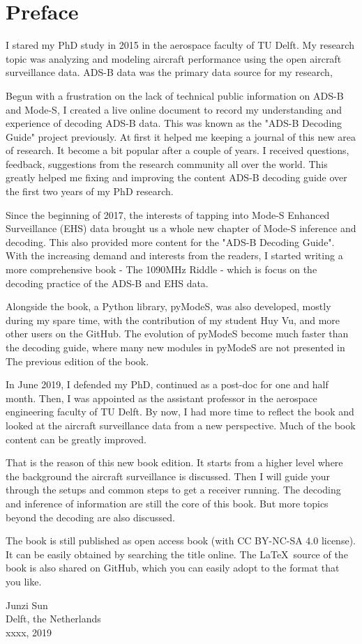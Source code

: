 \chapter*{Preface} \label{preface}
I stared my PhD study in 2015 in the aerospace faculty of TU Delft. My research topic was analyzing and modeling aircraft performance using the open aircraft surveillance data. ADS-B data was the primary data source for my research,

Begun with a frustration on the lack of technical public information on ADS-B and Mode-S, I created a live online document to record my understanding and experience of decoding ADS-B data. This was known as the "ADS-B Decoding Guide" project previously. At first it helped me keeping a journal of this new area of research. It become a bit popular after a couple of years. I received questions, feedback, suggestions from the research community all over the world. This greatly helped me fixing and improving the content ADS-B decoding guide over the first two years of my PhD research.

Since the beginning of 2017, the interests of tapping into
Mode-S Enhanced Surveillance (EHS) data brought us a whole new chapter of Mode-S inference and decoding. This also provided more content for the "ADS-B Decoding Guide". With the increasing demand and interests from the readers, I started writing a more comprehensive book - The 1090MHz Riddle - which is focus on the decoding practice of the ADS-B and EHS data.

Alongside the book, a Python library, pyModeS, was also developed, mostly during my spare time, with the contribution of my student Huy Vu, and more other users on the GitHub. The evolution of pyModeS become much faster than the decoding guide, where many new modules in pyModeS are not presented in The previous edition of the book.

In June 2019, I defended my PhD, continued as a post-doc for one and half month. Then, I was appointed as the assistant professor in the aerospace engineering faculty of TU Delft. By now, I had more time to reflect the book and looked at the aircraft surveillance data from a new perspective. Much of the book content can be greatly improved.

That is the reason of this new book edition. It starts from a higher level where the background the aircraft surveillance is discussed. Then I will guide your through the setups and common steps to get a receiver running. The decoding and inference of information are still the core of this book. But more topics beyond the decoding are also discussed.

The book is still published as open access book (with CC BY-NC-SA 4.0 license). It can be easily obtained by searching the title online. The \LaTeX~source of the book is also shared on GitHub, which you can easily adopt to the format that you like.

\begin{flushright}
  Junzi Sun \\
  Delft, the Netherlands \\
  xxxx, 2019
\end{flushright}
